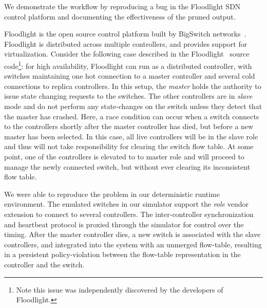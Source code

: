 We demonstrate the \simulator{} workflow by reproducing a bug in the Floodlight
SDN control platform and documenting the effectiveness of the pruned output.

Floodlight is the open source control platform built by BigSwitch
networks~\cite{bigswitch}. Floodlight is distributed across multiple
controllers, and provides support for virtualization.
Consider the following case described in the
Floodlight~\cite{floodlight} source code\footnote{Note this issue was
independently discovered by the developers of Floodlight.}: for high availability, Floodlight can run as a
distributed controller, with switches maintaining one hot connection to a master
controller and several cold connections to replica controllers.
In this setup, the \emph{master} holds the authority to issue state changing requests to the switches.
The other controllers are in \emph{slave} mode and do not perform any
state-changes on the switch unless they detect that the master has crashed.
Here, a race condition can occur when a switch connects
to the controllers shortly after the master controller has died, but
before a new master has been selected. In this case, all live controllers will be in
the slave role and thus will not take responsibility for clearing the switch
flow table. At some point, one of the controllers is elevated to to
master role and will proceed to manage the newly connected switch, but without
ever clearing its inconsistent flow table.

We were able to reproduce the problem in our deterministic runtime environment. The
emulated switches in our simulator support the \emph{role} vendor extension to
connect to several controllers. The inter-controller synchronization and heartbeat
protocol is proxied through the simulator for control over the timing. After the
master controller dies, a new switch is associated with the slave controllers, and
integrated into the system with an unmerged flow-table, resulting in a persistent
policy-violation between the flow-table representation in the controller and the switch.

